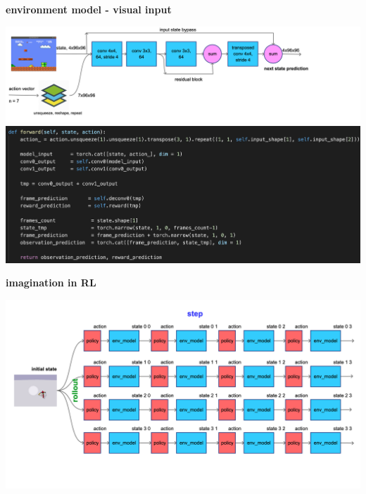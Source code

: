 \documentclass[xcolor=dvipsnames]{beamer}
\begin{document}
\begin{frame}{\bf environment model - visual input}

  {\centering \includegraphics[scale=0.12]{../diagrams/convcuriositydetail.png}}
  {\centering \includegraphics[scale=0.3]{../images/curiosity_conv.png}}

\end{frame}

\begin{frame}{\bf imagination in RL}

  {\centering \includegraphics[scale=0.12]{../diagrams/imagination.png}}

\end{frame}
\end{document}
